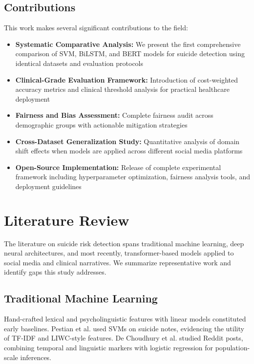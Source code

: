 \documentclass[conference]{IEEEtran}
\begin{document}
\subsection{Contributions}

This work makes several significant contributions to the field:

\begin{itemize}
    \item \textbf{Systematic Comparative Analysis:} We present the first comprehensive comparison of SVM, BiLSTM, and BERT models for suicide detection using identical datasets and evaluation protocols
    \item \textbf{Clinical-Grade Evaluation Framework:} Introduction of cost-weighted accuracy metrics and clinical threshold analysis for practical healthcare deployment
    \item \textbf{Fairness and Bias Assessment:} Complete fairness audit across demographic groups with actionable mitigation strategies
    \item \textbf{Cross-Dataset Generalization Study:} Quantitative analysis of domain shift effects when models are applied across different social media platforms
    \item \textbf{Open-Source Implementation:} Release of complete experimental framework including hyperparameter optimization, fairness analysis tools, and deployment guidelines
\end{itemize}

\section{Literature Review}

The literature on suicide risk detection spans traditional machine learning, deep neural architectures, and most recently, transformer-based models applied to social media and clinical narratives. We summarize representative work and identify gaps this study addresses.

\subsection{Traditional Machine Learning}
Hand-crafted lexical and psycholinguistic features with linear models constituted early baselines. Pestian et al. \cite{pestian2016} used SVMs on suicide notes, evidencing the utility of TF-IDF and LIWC-style features. De Choudhury et al. \cite{dechoudhury2016} studied Reddit posts, combining temporal and linguistic markers with logistic regression for population-scale inferences.
\end{document}
